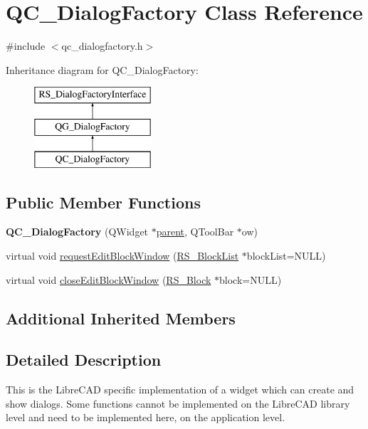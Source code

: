 \hypertarget{classQC__DialogFactory}{\section{Q\-C\-\_\-\-Dialog\-Factory Class Reference}
\label{classQC__DialogFactory}
}


{\ttfamily \#include $<$qc\-\_\-dialogfactory.\-h$>$}

Inheritance diagram for Q\-C\-\_\-\-Dialog\-Factory\-:\begin{figure}[H]
\begin{center}
\leavevmode
\includegraphics[height=3.000000cm]{classQC__DialogFactory}
\end{center}
\end{figure}
\subsection*{Public Member Functions}
\begin{DoxyCompactItemize}
\item 
\hypertarget{classQC__DialogFactory_a32df06a5281058acc1ba430e20ce7b26}{{\bfseries Q\-C\-\_\-\-Dialog\-Factory} (Q\-Widget $\ast$\hyperlink{classQG__DialogFactory_a3f4a0e132723a8da0aaac5c1f8bab7dd}{parent}, Q\-Tool\-Bar $\ast$ow)}\label{classQC__DialogFactory_a32df06a5281058acc1ba430e20ce7b26}

\item 
virtual void \hyperlink{classQC__DialogFactory_a8e29de8d89f21be4baa06d6d3417484f}{request\-Edit\-Block\-Window} (\hyperlink{classRS__BlockList}{R\-S\-\_\-\-Block\-List} $\ast$block\-List=N\-U\-L\-L)
\item 
virtual void \hyperlink{classQC__DialogFactory_a52ea89acfc6fe034fe68a8be8310b12d}{close\-Edit\-Block\-Window} (\hyperlink{classRS__Block}{R\-S\-\_\-\-Block} $\ast$block=N\-U\-L\-L)
\end{DoxyCompactItemize}
\subsection*{Additional Inherited Members}


\subsection{Detailed Description}
This is the Libre\-C\-A\-D specific implementation of a widget which can create and show dialogs. Some functions cannot be implemented on the Libre\-C\-A\-D library level and need to be implemented here, on the application level. 

